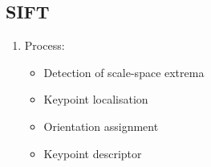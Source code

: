 \documentclass[9pt]{article}
\begin{document}
\begin{multicols}{2}
        \subsection{SIFT}
        \begin{enumerate}
            \item Process:
            \begin{itemize}
                \item Detection of scale-space extrema 
                \item Keypoint localisation 
                \item Orientation assignment 
                \item Keypoint descriptor
            \end{itemize}
        \end{enumerate}

    


    

\end{multicols}

\pagebreak
\end{document}

